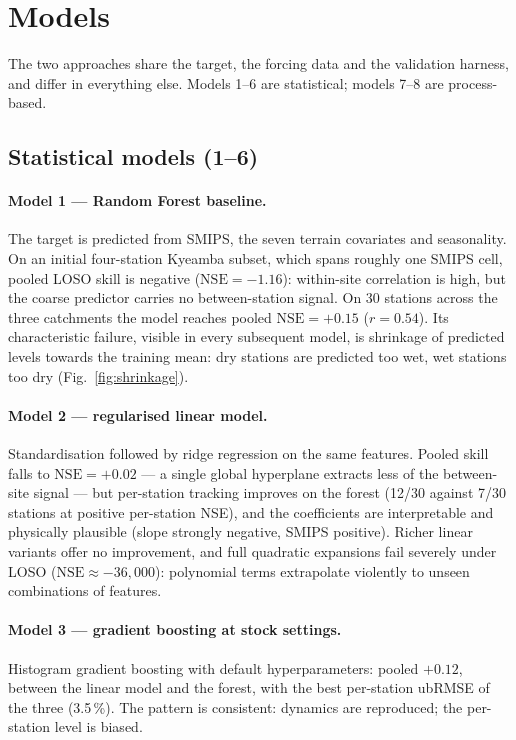 \documentclass[11pt,a4paper]{article}
\newcommand{\nse}{\mathrm{NSE}}
\begin{document}
\section{Models}\label{sec:models}

The two approaches share the target, the forcing data and the validation
harness, and differ in everything else. Models 1--6 are statistical; models
7--8 are process-based.

\subsection{Statistical models (1--6)}\label{sec:mltrack}

\paragraph{Model 1 --- Random Forest baseline.} The target is predicted from
SMIPS, the seven terrain covariates and seasonality. On an initial
four-station Kyeamba subset, which spans roughly one SMIPS cell, pooled LOSO
skill is negative ($\nse = -1.16$): within-site correlation is high, but the
coarse predictor carries no between-station signal. On 30 stations across the
three catchments the model reaches pooled $\nse = +0.15$ ($r = 0.54$). Its
characteristic failure, visible in every subsequent model, is shrinkage of
predicted levels towards the training mean: dry stations are predicted too
wet, wet stations too dry (Fig.~\ref{fig:shrinkage}).

\paragraph{Model 2 --- regularised linear model.} Standardisation followed by
ridge regression on the same features. Pooled skill falls to $\nse = +0.02$
--- a single global hyperplane extracts less of the between-site signal ---
but per-station tracking improves on the forest (12/30 against 7/30 stations
at positive per-station NSE), and the coefficients are interpretable and
physically plausible (slope strongly negative, SMIPS positive). Richer linear
variants offer no improvement, and full quadratic expansions fail severely
under LOSO ($\nse \approx -36{,}000$): polynomial terms extrapolate violently
to unseen combinations of features.

\paragraph{Model 3 --- gradient boosting at stock settings.} Histogram
gradient boosting \citep[\texttt{HistGradientBoostingRegressor};][]
{pedregosa2011sklearn} with default hyperparameters: pooled $+0.12$, between
the linear model and the forest, with the best per-station ubRMSE of the three
(3.5\,\%). The pattern is consistent: dynamics are reproduced; the per-station
level is biased.
\end{document}
